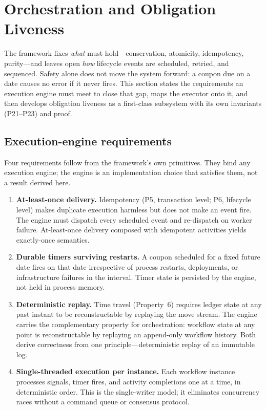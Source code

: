 \section{Orchestration and Obligation Liveness}
\label{sec:sec14}\label{sec:temporal}

The framework fixes \emph{what} must hold---conservation, atomicity, idempotency, purity---and leaves open \emph{how} lifecycle events are scheduled, retried, and sequenced. Safety alone does not move the system forward: a coupon due on a date causes no error if it never fires. This section states the requirements an execution engine must meet to close that gap, maps the executor onto it, and then develops obligation liveness as a first-class subsystem with its own invariants (P21--P23) and proof.

\subsection{Execution-engine requirements}
\label{sec:exec-requirements}

Four requirements follow from the framework's own primitives. They bind any execution engine; the engine is an implementation choice that satisfies them, not a result derived here.

\begin{enumerate}[nosep]
\item \textbf{At-least-once delivery.} Idempotency (P5, transaction level; P6, lifecycle level) makes duplicate execution harmless but does not make an event fire. The engine must dispatch every scheduled event and re-dispatch on worker failure. At-least-once delivery composed with idempotent activities yields exactly-once semantics.

\item \textbf{Durable timers surviving restarts.} A coupon scheduled for a fixed future date fires on that date irrespective of process restarts, deployments, or infrastructure failures in the interval. Timer state is persisted by the engine, not held in process memory.

\item \textbf{Deterministic replay.} Time travel (Property~6) requires ledger state at any past instant to be reconstructable by replaying the move stream. The engine carries the complementary property for orchestration: workflow state at any point is reconstructable by replaying an append-only workflow history. Both derive correctness from one principle---deterministic replay of an immutable log.

\item \textbf{Single-threaded execution per instance.} Each workflow instance processes signals, timer fires, and activity completions one at a time, in deterministic order. This is the single-writer model; it eliminates concurrency races without a command queue or consensus protocol.
\end{enumerate}

